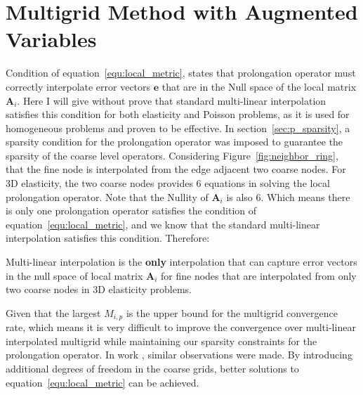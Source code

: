 \section{Multigrid Method with Augmented Variables}
Condition of equation~\ref{equ:local_metric}, states that prolongation operator must correctly interpolate error vectors $\mathbf{e}$ that are in the Null space of the local matrix $\mathbf{A}_i$. Here I will give without prove that standard multi-linear interpolation satisfies this condition for both elasticity and Poisson problems, as it is used for homogeneous problems and proven to be effective. In section~\ref{sec:p_sparsity}, a sparsity condition for the prolongation operator was imposed to guarantee the sparsity of the coarse level operators. Considering Figure~\ref{fig:neighbor_ring}, that the fine node is interpolated from the edge adjacent two coarse nodes. For 3D elasticity, the two coarse nodes provides 6 equations in solving the local prolongation operator. Note that the Nullity of $\mathbf{A}_i$ is also 6. Which means there is only one prolongation operator satisfies the condition of equation~\ref{equ:local_metric}, and we know that the standard multi-linear interpolation satisfies this condition. Therefore:
\begin{lem}\label{lemma:linear_best} 
 Multi-linear interpolation is the \textbf{only} interpolation that can capture error vectors in the null space of local matrix $\mathbf{A}_i$ for fine nodes that are interpolated from only two coarse nodes in 3D elasticity problems.
\end{lem}
Given that the largest $M_{i,p}$ is the upper bound for the multigrid convergence rate, which means it is very difficult to improve the convergence over multi-linear interpolated multigrid while maintaining our sparsity constraints for the prolongation operator. In work \cite{dohrmann2007interpolation}, similar observations were made. By introducing additional degrees of freedom in the coarse grids, better solutions to equation~\ref{equ:local_metric} can be achieved. 
